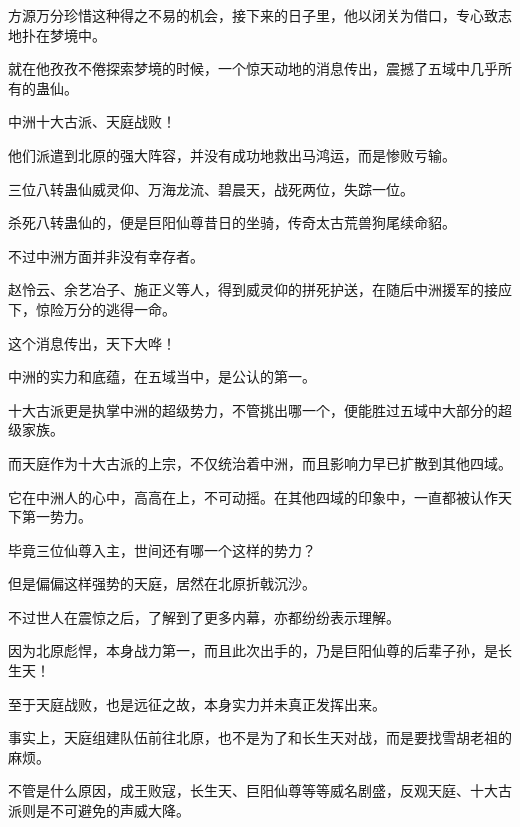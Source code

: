 \begin{this_body}
方源万分珍惜这种得之不易的机会，接下来的日子里，他以闭关为借口，专心致志地扑在梦境中。

就在他孜孜不倦探索梦境的时候，一个惊天动地的消息传出，震撼了五域中几乎所有的蛊仙。

中洲十大古派、天庭战败！

他们派遣到北原的强大阵容，并没有成功地救出马鸿运，而是惨败亏输。

三位八转蛊仙威灵仰、万海龙流、碧晨天，战死两位，失踪一位。

杀死八转蛊仙的，便是巨阳仙尊昔日的坐骑，传奇太古荒兽狗尾续命貂。

不过中洲方面并非没有幸存者。

赵怜云、余艺冶子、施正义等人，得到威灵仰的拼死护送，在随后中洲援军的接应下，惊险万分的逃得一命。

这个消息传出，天下大哗！

中洲的实力和底蕴，在五域当中，是公认的第一。

十大古派更是执掌中洲的超级势力，不管挑出哪一个，便能胜过五域中大部分的超级家族。

而天庭作为十大古派的上宗，不仅统治着中洲，而且影响力早已扩散到其他四域。

它在中洲人的心中，高高在上，不可动摇。在其他四域的印象中，一直都被认作天下第一势力。

毕竟三位仙尊入主，世间还有哪一个这样的势力？

但是偏偏这样强势的天庭，居然在北原折戟沉沙。

不过世人在震惊之后，了解到了更多内幕，亦都纷纷表示理解。

因为北原彪悍，本身战力第一，而且此次出手的，乃是巨阳仙尊的后辈子孙，是长生天！

至于天庭战败，也是远征之故，本身实力并未真正发挥出来。

事实上，天庭组建队伍前往北原，也不是为了和长生天对战，而是要找雪胡老祖的麻烦。

不管是什么原因，成王败寇，长生天、巨阳仙尊等等威名剧盛，反观天庭、十大古派则是不可避免的声威大降。

\end{this_body}

